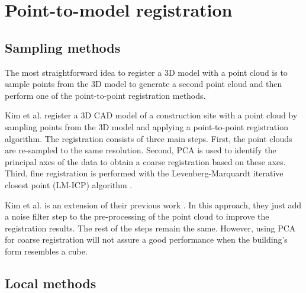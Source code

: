     \section{Point-to-model registration}

        \subsection{Sampling methods} 

        The most straightforward idea to register a 3D model with a point cloud is to sample points from the 3D model 
        to generate a second point cloud and then perform one of the point-to-point registration methods. 

        Kim et al. \cite{Kim_2011_fully} register a 3D CAD model of a construction site with a point cloud by sampling points from the 3D model 
        and applying a point-to-point registration algorithm. The registration consists of three main steps. First, 
        the point clouds are re-sampled to the same resolution. Second, PCA is used to identify the principal axes of the data 
        to obtain a coarse registration based on these axes. Third, fine registration is performed with the Levenberg-Marquardt
        iterative closest point (LM-ICP) algorithm \cite{Fitzgibbon_2003_robust}. 
        
        Kim et al. \cite{Kim_2013_fully} is an extension of their previous work \cite{Kim_2011_fully}.
        In this approach, they just add a noise filter step to the pre-processing of the point cloud to improve the registration results.
        The rest of the steps remain the same.
        However, using PCA for coarse registration will not assure a good performance when the building’s form resembles a cube.
        
        \subsection{Local methods} 

